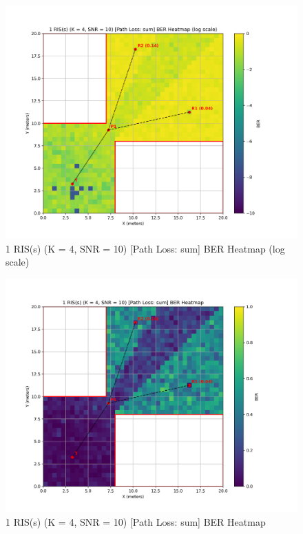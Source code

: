 \begin{figure}[H]
  \centering
  \includegraphics[width=0.8\linewidth]{imgs/heatmap-simulations/1 RIS(s) (K = 4, SNR = 10) [Path Loss_ sum] BER Heatmap (log scale).png}
  \caption{1 RIS(s) (K = 4, SNR = 10) [Path Loss: sum] BER Heatmap (log scale)}
\end{figure}

\begin{figure}[H]
  \centering
  \includegraphics[width=0.8\linewidth]{imgs/heatmap-simulations/1 RIS(s) (K = 4, SNR = 10) [Path Loss_ sum] BER Heatmap.png}
  \caption{1 RIS(s) (K = 4, SNR = 10) [Path Loss: sum] BER Heatmap}
\end{figure}

